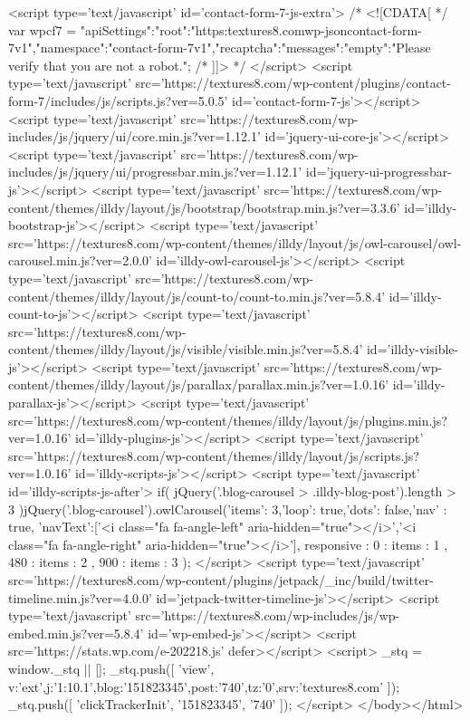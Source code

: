<script type='text/javascript' id='contact-form-7-js-extra'>
/* <![CDATA[ */
var wpcf7 = {"apiSettings":{"root":"https:\/\/textures8.com\/wp-json\/contact-form-7\/v1","namespace":"contact-form-7\/v1"},"recaptcha":{"messages":{"empty":"Please verify that you are not a robot."}}};
/* ]]> */
</script>
<script type='text/javascript' src='https://textures8.com/wp-content/plugins/contact-form-7/includes/js/scripts.js?ver=5.0.5' id='contact-form-7-js'></script>
<script type='text/javascript' src='https://textures8.com/wp-includes/js/jquery/ui/core.min.js?ver=1.12.1' id='jquery-ui-core-js'></script>
<script type='text/javascript' src='https://textures8.com/wp-includes/js/jquery/ui/progressbar.min.js?ver=1.12.1' id='jquery-ui-progressbar-js'></script>
<script type='text/javascript' src='https://textures8.com/wp-content/themes/illdy/layout/js/bootstrap/bootstrap.min.js?ver=3.3.6' id='illdy-bootstrap-js'></script>
<script type='text/javascript' src='https://textures8.com/wp-content/themes/illdy/layout/js/owl-carousel/owl-carousel.min.js?ver=2.0.0' id='illdy-owl-carousel-js'></script>
<script type='text/javascript' src='https://textures8.com/wp-content/themes/illdy/layout/js/count-to/count-to.min.js?ver=5.8.4' id='illdy-count-to-js'></script>
<script type='text/javascript' src='https://textures8.com/wp-content/themes/illdy/layout/js/visible/visible.min.js?ver=5.8.4' id='illdy-visible-js'></script>
<script type='text/javascript' src='https://textures8.com/wp-content/themes/illdy/layout/js/parallax/parallax.min.js?ver=1.0.16' id='illdy-parallax-js'></script>
<script type='text/javascript' src='https://textures8.com/wp-content/themes/illdy/layout/js/plugins.min.js?ver=1.0.16' id='illdy-plugins-js'></script>
<script type='text/javascript' src='https://textures8.com/wp-content/themes/illdy/layout/js/scripts.js?ver=1.0.16' id='illdy-scripts-js'></script>
<script type='text/javascript' id='illdy-scripts-js-after'>
if( jQuery('.blog-carousel > .illdy-blog-post').length > 3 ){jQuery('.blog-carousel').owlCarousel({'items': 3,'loop': true,'dots': false,'nav' : true, 'navText':['<i class="fa fa-angle-left" aria-hidden="true"></i>','<i class="fa fa-angle-right" aria-hidden="true"></i>'], responsive : { 0 : { items : 1 }, 480 : { items : 2 }, 900 : { items : 3 } }});}
</script>
<script type='text/javascript' src='https://textures8.com/wp-content/plugins/jetpack/_inc/build/twitter-timeline.min.js?ver=4.0.0' id='jetpack-twitter-timeline-js'></script>
<script type='text/javascript' src='https://textures8.com/wp-includes/js/wp-embed.min.js?ver=5.8.4' id='wp-embed-js'></script>
<script src='https://stats.wp.com/e-202218.js' defer></script>
<script>
	_stq = window._stq || [];
	_stq.push([ 'view', {v:'ext',j:'1:10.1',blog:'151823345',post:'740',tz:'0',srv:'textures8.com'} ]);
	_stq.push([ 'clickTrackerInit', '151823345', '740' ]);
</script>
</body></html>
